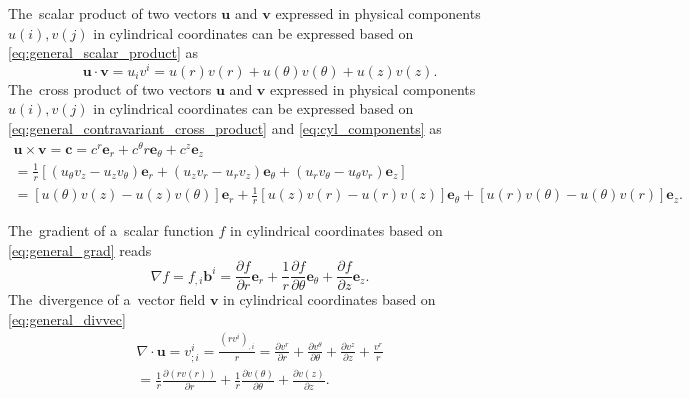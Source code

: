 \documentclass[review]{elsarticle}
\newcommand{\pdv}[2]{\frac{\partial{#1}}{\partial{#2}}}
\newcommand{\vect}[1]{\boldsymbol{#1}}
\begin{document}
The~scalar product of two vectors $\vect{u}$ and $\vect{v}$ expressed 
in physical components $u(i), v(j)$ in cylindrical coordinates can be expressed 
based on \eqref{eq:general_scalar_product} as
\begin{equation}
  \vect{u}\cdot\vect{v} = u_i v^i = u(r)v(r) + u(\theta)v(\theta) 
  + u(z)v(z) .
  \label{eq:cyl_scalar_product}
\end{equation}
The~cross product of two vectors $\vect{u}$ and $\vect{v}$ expressed 
in physical components $u(i), v(j)$ in cylindrical coordinates can be expressed 
based on \eqref{eq:general_contravariant_cross_product} 
and \eqref{eq:cyl_components} as
\begin{multline}
  \vect{u}\times\vect{v} = \vect{c} = c^r \vect{e}_r 
  + c^\theta r \vect{e}_\theta + c^z \vect{e}_z \\
  = \frac{1}{r}\left[
  (u_\theta v_z - u_z v_\theta) \vect{e}_r 
  +  (u_z v_r - u_r v_z) \vect{e}_\theta
  +  (u_r v_\theta - u_\theta v_r)\vect{e}_z
  \right] \\
 = [u(\theta) v(z) - u(z) v(\theta)] \vect{e}_r
 + \frac{1}{r}[u(z) v(r) - u(r) v(z)] \vect{e}_\theta 
 + [u(r) v(\theta) - u(\theta) v(r)]\vect{e}_z .
 \label{eq:cyl_cross_product}
\end{multline}

The~gradient of a~scalar function $f$ in cylindrical coordinates based on 
\eqref{eq:general_grad} reads
\begin{equation}
  \nabla f = f_{,i}\vect{b}^i = \pdv{f}{r}\vect{e}_r 
  + \frac{1}{r}\pdv{f}{\theta}\vect{e}_{\theta} 
  + \pdv{f}{z}\vect{e}_z .
  \label{eq:cyl_gradf}
\end{equation}
The~divergence of a~vector field $\vect{v}$ in cylindrical coordinates based on
\eqref{eq:general_divvec}
\begin{multline}
  \nabla\cdot\vect{u} = v^i_{;i} = 
  \frac{(r v^i)_{,i}}{r}
  = \pdv{v^r}{r} + \pdv{v^\theta}{\theta} 
  + \pdv{v^z}{z} + \frac{v^r}{r} \\
  = \frac{1}{r}\pdv{(r v(r))}{r} + \frac{1}{r}\pdv{v(\theta)}{\theta} 
  + \pdv{v(z)}{z} .
  \label{eq:cyl_gradf}
\end{multline}
\end{document}
